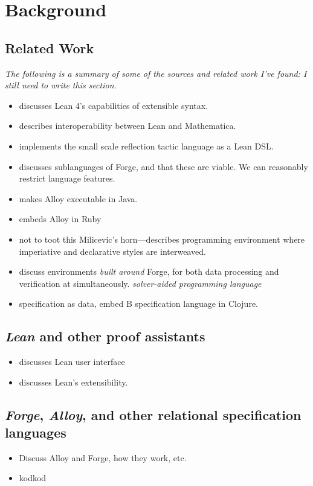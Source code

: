 \section{Background}
\subsection{Related Work}
\emph{The following is a summary of some of the sources and related work I've found: I still need to write this section.}
\begin{itemize}
    \item \cite{ullrich2022beyond} discusses Lean 4's capabilities of extensible syntax. 
    \item \cite{lewis2022bi} describes interoperability between Lean and Mathematica. 
    \item \cite{gladshtein2024small} implements the small scale reflection tactic language as a Lean DSL. 
    \item \cite{ngpdbccdlrrvwwk-oopsla-2024} discusses sublanguages of Forge, and that these are viable. We can reasonably restrict language features. 
    \item \cite{milicevic2010executable} makes Alloy executable in Java. 
    \item \cite{milicevic2014alpha} embeds Alloy in Ruby
    \item \cite{milicevic2015advancing} not to toot this Milicevic's horn---describes programming environment where imperiative and declarative styles are interweaved. 
    \item \cite{st2023comparison} discuss environments \emph{built around} Forge, for both data processing and verification at simultaneously. \emph{solver-aided programming language}
    \item \cite{korner2022embedding} specification as data, embed B specification language in Clojure. 
\end{itemize}

\subsection{\emph{Lean} and other proof assistants}
\begin{itemize}
    \item \cite{nawrocki2023extensible} discusses Lean user interface
    \item \cite{moura2021lean} discusses Lean's extensibility. 
\end{itemize}

\subsection{\emph{Forge}, \emph{Alloy}, and other relational specification languages}
\begin{itemize}
    \item Discuss Alloy and Forge, how they work, etc. 
    \item \cite{torlak2007kodkod} kodkod
\end{itemize}
